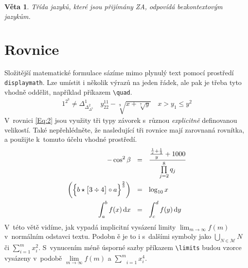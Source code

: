 \documentclass[11pt, a4paper, twocolumn]{article}
\newtheorem{theorem}{Věta}
\begin{document}
\begin{theorem}
    Třída jazyků, které jsou přijímány ZA, odpovídá \emph{bezkontextovým jazykům.}
\end{theorem}

\section{Rovnice}
Složitější matematické formulace sázíme mimo plynulý text pomocí prostředí 
\texttt{displaymath}. Lze umístit i několik výrazů na jeden řádek, ale pak je třeba tyto vhodně
oddělit, například příkazem \verb|\quad|.
\begin{align*}
1^{2^3} \neq \Delta_{\Delta_{\Delta^3}^2}^1 \quad y_{22}^{11} - \sqrt[9]{x + \sqrt[7]{y} } \quad x > y_1 \leq y^2 
\end{align*}
V~rovnici \eqref{Eq:2} jsou využity tři typy
závorek s~různou \textit{explicitně} definovanou velikostí. Také nepřehlédněte,
že nasledující tři rovnice mají zarovnaná rovnítka, a použijte k~tomuto účelu vhodné 
prostředí.
\begin{align}
    -\cos^2 \beta \ \ &= \ \  \frac{\frac{\frac{1}{x} + \frac{1}{3}}{y} + 1000}{\underset{j=2}{\overset{8}{\prod}}\,q_j} \label{Eq:1}\\
    \biggl( \Bigl\{ b \star \bigl[3 \div 4\bigr] \circ a\Bigr\}^{\frac{2}{3}} \biggr) \ \  &= \ \ \log_{10} x \label{Eq:2}\\
    \int_a^b f(x)\,\mathrm{d}x \ \  &= \ \  \int_c^d f(y)\,\mathrm{d}y \label{Eq:3}
\end{align}
\noindent V~této větě vidíme, jak vypadá implicitní vysázení limity
$\lim_{m\to\infty} f(m)$
v~normálním odstavci textu. Podobn  ě je to i s~dalšími symboly jako
$\bigcup_{N\in\mathcal{M}} N$
či 
$\sum_{i=1}^{m} x_{i}^{2}$.
S~vynucením méně úsporné sazby příkazem \verb|\limits| 
budou vzorce vysázeny v~podobě $\lim\limits_{m \to \infty} f(m)$ a 
$\underset{i=1}{\overset{m}{\sum}} x_i^4$.
\end{document}
